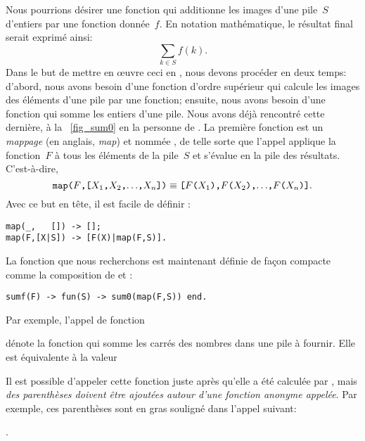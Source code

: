 Nous pourrions désirer une fonction qui additionne les images d'une
pile~\(S\) d'entiers par une fonction donnée~\(f\). En notation
mathématique, le résultat final serait exprimé ainsi:
\begin{equation*}
\sum_{k \in S}{f(k)}.
\end{equation*}
Dans le but de mettre en {\oe}uvre ceci en \Erlang, nous devons
procéder en deux temps: d'abord, nous avons besoin d'une fonction
d'ordre supérieur qui calcule les images des éléments d'une pile par
une fonction; ensuite, nous avons besoin d'une fonction qui somme les
entiers d'une pile. Nous avons déjà rencontré cette dernière, à la
\fig~\vref{fig_sum0} en la personne de . La première
fonction est un \emph{mappage} (en anglais, \emph{map}) et nommée
, de telle sorte que l'appel 
applique la fonction~\(F\) à tous les éléments de la pile~\(S\) et
s'évalue en la pile des résultats. C'est-à-dire,
\begin{equation*}
\texttt{map(\(F\),[\(X_1\),\(X_2\),\(\ldots\),\(X_{n}\)])}
\equiv
\texttt{[\(F\)(\(X_1\)),\(F\)(\(X_2\)),\(\ldots\),\(F\)(\(X_{n}\))]}.
\end{equation*}
Avec ce but en tête, il est facile de définir :
\begin{verbatim}
map(_,   []) -> [];
map(F,[X|S]) -> [F(X)|map(F,S)].
\end{verbatim}
La fonction que nous recherchons est maintenant définie de façon
compacte comme la composition de  et :
\begin{verbatim}
sumf(F) -> fun(S) -> sum0(map(F,S)) end.
\end{verbatim}
Par exemple, l'appel de fonction
\begin{center}
\end{center}
dénote la fonction qui somme les carrés des nombres dans une pile à
fournir. Elle est équivalente à la valeur
\begin{center}
\end{center}
Il est possible d'appeler cette fonction juste après qu'elle a été
calculée par , mais \emph{des parenthèses doivent être
  ajoutées autour d'une fonction anonyme appelée}. Par exemple, ces
parenthèses sont en gras souligné dans l'appel suivant:
\begin{center}
.
\end{center}
